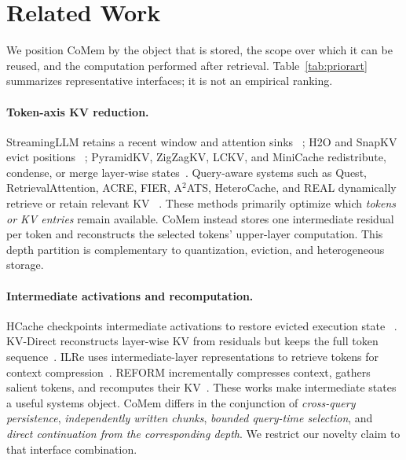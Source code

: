 \section{Related Work}
\label{sec:related}

We position CoMem by the object that is stored, the scope over which it can be
reused, and the computation performed after retrieval. Table~\ref{tab:priorart}
summarizes representative interfaces; it is not an empirical ranking.



\paragraph{Token-axis KV reduction.}
StreamingLLM retains a recent window and attention sinks
~\citep{streamingllm}; H2O and SnapKV evict positions
~\citep{h2o,snapkv}; PyramidKV, ZigZagKV, LCKV, and MiniCache redistribute,
condense, or merge layer-wise states~\citep{pyramidkv,zigzagkv,lckv,minicache}.
Query-aware systems such as Quest, RetrievalAttention, ACRE, FIER, A$^2$ATS,
HeteroCache, and REAL dynamically retrieve or retain relevant KV
~\citep{quest,retrievalattention,acre,fier,a2ats,heterocache,real}. These methods
primarily optimize which \emph{tokens or KV entries} remain available. CoMem
instead stores one intermediate residual per token and reconstructs the selected
tokens' upper-layer computation. This depth partition is complementary to
quantization, eviction, and heterogeneous storage.

\paragraph{Intermediate activations and recomputation.}
HCache checkpoints intermediate activations to restore evicted execution state
~\citep{hcache}. KV-Direct reconstructs layer-wise KV from residuals but keeps
the full token sequence~\citep{kvdirect}. ILRe uses intermediate-layer
representations to retrieve tokens for context compression~\citep{ilre}.
REFORM incrementally compresses context, gathers salient tokens, and recomputes
their KV~\citep{reform}. These works make intermediate states a useful systems
object. CoMem differs in the conjunction of \emph{cross-query persistence},
\emph{independently written chunks}, \emph{bounded query-time selection}, and
\emph{direct continuation from the corresponding depth}. We restrict our
novelty claim to that interface combination.

